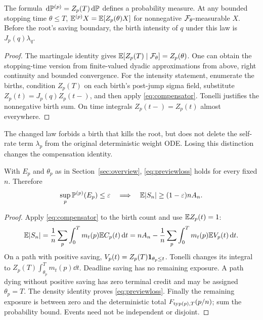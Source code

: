 \begin{lemma}\label{lem:pointlaw}
The formula \(\,\mathrm d\mathbb P^{(p)}=Z_p(T)\,\mathrm d\mathbb P\) defines a probability
measure. At any bounded stopping time \(\theta\le T\),
\(\mathbb E^{(p)}X=\mathbb E[Z_p(\theta)X]\) for nonnegative
\(\mathcal F_\theta\)-measurable \(X\). Before the root's saving boundary,
the birth intensity of \(q\) under this law is \(J_p(q)\lambda_q\).
\end{lemma}
\begin{proof}
The martingale identity gives
\(\mathbb E[Z_p(T)\mid\mathcal F_\theta]=Z_p(\theta)\).
One can obtain the stopping-time version from finite-valued dyadic
approximations from above, right continuity and bounded convergence.
For the intensity statement, enumerate the births, condition
\(Z_p(T)\) on each birth's post-jump sigma field, substitute
\(Z_p(t)=J_p(q)Z_p(t-)\), and then apply
\eqref{eq:compensator}. Tonelli justifies the nonnegative birth sum.
On time integrals \(Z_p(t-)=Z_p(t)\) almost everywhere.
\end{proof}

The changed law forbids a birth that kills the root, but does not
delete the self-rate term \(\lambda_p\) from the original deterministic
weight ODE. Losing this distinction changes the compensation identity.

\begin{proposition}\label{prop:loss}
With \(E_p\) and \(\theta_p\) as in Section~\ref{sec:overview},
\eqref{eq:previewloss} holds for every fixed \(n\). Therefore
\[
 \sup_p\mathbb P^{(p)}(E_p)\le\varepsilon
 \quad\Longrightarrow\quad
 \mathbb E|S_n|\ge(1-\varepsilon)n A_n.
\]
\end{proposition}
\begin{proof}
Apply \eqref{eq:compensator} to the birth count and use \(\mathbb E Z_p(t)=1\):
\[
 \mathbb E|S_n|=\frac1n\sum_p\int_0^T m_t(p)\mathbb E C_p(t)\,\mathrm d t
 =nA_n-\frac1n\sum_p\int_0^T m_t(p)\mathbb E V_p(t)\,\mathrm d t.
\]
On a path with positive saving,
\(V_p(t)=Z_p(T)\mathbf 1_{\theta_p\le t}\). Tonelli changes its integral
to \(Z_p(T)\int_{\theta_p}^T m_t(p)\dd t\).
Deadline saving has no remaining exposure. A path dying without
positive saving has zero terminal credit and may be assigned
\(\theta_p=T\). The density identity proves \eqref{eq:previewloss}.
Finally the remaining exposure is between zero and the deterministic
total \(F_{\operatorname{typ}(p),T}(p/n)\); sum the probability bound. Events need
not be independent or disjoint.
\end{proof}


